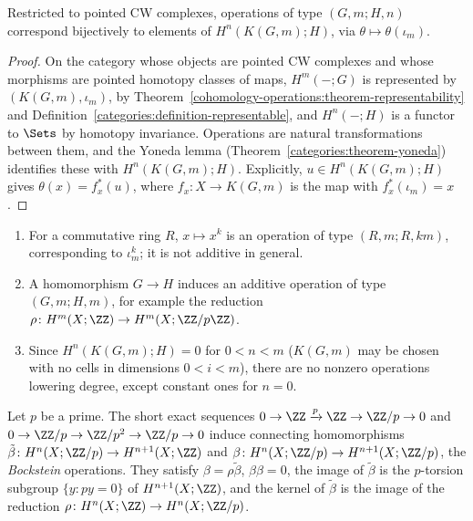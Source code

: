 \begin{proposition}\label{cohomology-operations:proposition-operations-representable}
Restricted to pointed CW complexes, operations of type $(G, m; H, n)$ correspond bijectively to elements of $H^n(K(G, m); H)$, via $\theta \mapsto \theta(\iota_m)$.
\end{proposition}

\begin{proof}
On the category whose objects are pointed CW complexes and whose morphisms are pointed homotopy classes of maps, $H^m(-; G)$ is represented by $(K(G, m), \iota_m)$, by
Theorem~\ref{cohomology-operations:theorem-representability} and Definition~\ref{categories:definition-representable}, and $H^n(-; H)$ is a functor to $\Sets$ by
homotopy invariance. Operations are natural transformations between them, and the Yoneda lemma (Theorem~\ref{categories:theorem-yoneda}) identifies these with
$H^n(K(G, m); H)$. Explicitly, $u \in H^n(K(G, m); H)$ gives $\theta(x) = f_x^*(u)$, where $f_x \colon X \to K(G, m)$ is the map with $f_x^*(\iota_m) = x$.
\end{proof}

\begin{example}\label{cohomology-operations:example-operations}
\begin{enumerate}
\item For a commutative ring $R$, $x \mapsto x^k$ is an operation of type $(R, m; R, km)$, corresponding to $\iota_m^k$; it is not additive in general.
\item A homomorphism $G \to H$ induces an additive operation of type $(G, m; H, m)$, for example the reduction $\rho \colon H^m(X; \ZZ) \to H^m(X; \ZZ/p\ZZ)$.
\item Since $H^n(K(G, m); H) = 0$ for $0 < n < m$ ($K(G, m)$ may be chosen with no cells in dimensions $0 < i < m$), there are no nonzero operations lowering degree, except
constant ones for $n = 0$.
\end{enumerate}
\end{example}

\begin{proposition}\label{cohomology-operations:proposition-bockstein}
Let $p$ be a prime. The short exact sequences $0 \to \ZZ \xrightarrow{p} \ZZ \to \ZZ/p \to 0$ and $0 \to \ZZ/p \to \ZZ/p^2 \to \ZZ/p \to 0$ induce connecting homomorphisms
$\tilde\beta \colon H^n(X; \ZZ/p) \to H^{n+1}(X; \ZZ)$ and $\beta \colon H^n(X; \ZZ/p) \to H^{n+1}(X; \ZZ/p)$, the \emph{Bockstein} operations. They satisfy $\beta = \rho\tilde\beta$,
$\beta\beta = 0$, the image of $\tilde\beta$ is the $p$-torsion subgroup $\{y : py = 0\}$ of $H^{n+1}(X; \ZZ)$, and the kernel of $\tilde\beta$ is the image of the reduction
$\rho \colon H^n(X; \ZZ) \to H^n(X; \ZZ/p)$.
\end{proposition}

